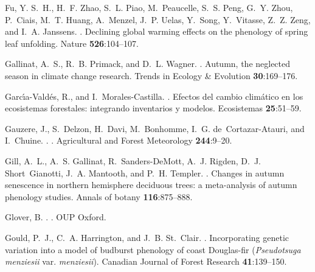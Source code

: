 \documentclass{article}
\begin{document}
\begin{thebibliography}{131}
Fu, Y. S.~H., H.~F. Zhao, S.~L. Piao, M.~Peaucelle, S.~S. Peng, G.~Y. Zhou,
  P.~Ciais, M.~T. Huang, A.~Menzel, J.~P. Uelas, Y.~Song, Y.~Vitasse, Z.~Z.
  Zeng, and I.~A. Janssens.
.
\newblock Declining global warming effects on the phenology of spring leaf
  unfolding.
\newblock Nature {\bf 526}:104--107.

Gallinat, A.~S., R.~B. Primack, and D.~L. Wagner.
.
\newblock Autumn, the neglected season in climate change research.
\newblock Trends in Ecology \& Evolution {\bf 30}:169--176.

Garc{\'\i}a-Vald{\'e}s, R., and I.~Morales-Castilla.
.
\newblock Efectos del cambio clim{\'a}tico en los ecosistemas forestales:
  integrando inventarios y modelos.
\newblock Ecosistemas {\bf 25}:51--59.

Gauzere, J., S.~Delzon, H.~Davi, M.~Bonhomme, I.~G. de~Cortazar-Atauri, and
  I.~Chuine.
.
.
\newblock Agricultural and Forest Meteorology {\bf 244}:9--20.

Gill, A.~L., A.~S. Gallinat, R.~Sanders-DeMott, A.~J. Rigden, D.~J.
  Short~Gianotti, J.~A. Mantooth, and P.~H. Templer.
.
\newblock Changes in autumn senescence in northern hemisphere deciduous trees:
  a meta-analysis of autumn phenology studies.
\newblock Annals of botany {\bf 116}:875--888.

Glover, B.
.
.
\newblock OUP Oxford.

Gould, P.~J., C.~A. Harrington, and J.~B. St.~Clair.
.
\newblock Incorporating genetic variation into a model of budburst phenology of
  coast {Douglas-fir (\emph{Pseudotsuga menziesii} var. \emph{menziesii})}.
\newblock Canadian Journal of Forest Research {\bf 41}:139--150.


\end{thebibliography}
\end{document}

